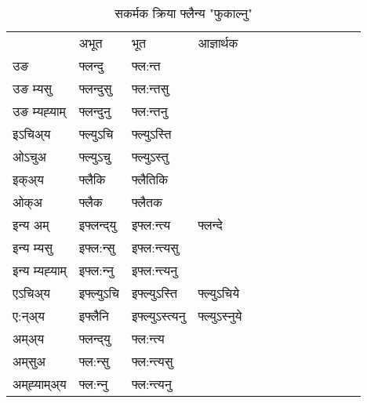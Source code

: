 \begin{table}[H]
\centering
\caption{\label{unt.vt} सकर्मक क्रिया  फ्लैन्य  "फुकाल्नु"  }
\begin{tabular}{l|l|l|l|l|l|l|l|l|l|l|l|l}  \toprule
&अभूत & भूत & आज्ञार्थक \\ 
उङ &फ्लन्दु &फ्ल:न्त \\ 
उङ म्यसु &फ्लन्दुसु &फ्ल:न्तसु \\ 
उङ म्यह्‍याम् &फ्लन्दुनु &फ्ल:न्तनु \\ 
इऽचिअ्य &फ्ल्युऽचि &फ्ल्युऽस्ति   \\ 
ओऽचुअ &फ्ल्युऽचु &फ्ल्युऽस्तु   \\ 
इक्अ्य &फ्लैकि &फ्लैतिकि   \\ 
ओक्अ &फ्लैक &फ्लैतक   \\ 
इन्य अम् & इफ्लन्द्‌यु  & इफ्ल:न्त्य &फ्लन्दे  \\ 
इन्य म्यसु & इफ्ल:न्सु  & इफ्ल:न्त्यसु   \\ 
इन्य म्यह्‍याम् & इफ्ल:न्‍नु  & इफ्ल:न्त्यनु   \\ 
एऽचिअ्य & इफ्ल्युऽचि & इफ्ल्युऽस्ति &फ्ल्युऽचिये    \\ 
ए:न्अ्य & इफ्लैनि  & इफ्ल्युऽस्त्यनु &फ्ल्युऽस्‍नुये  \\ 
अम्अ्य & फ्लन्द्‌यु  & फ्ल:न्त्य  \\ 
अम्‌सुअ & फ्ल:न्सु & फ्ल:न्त्यसु  \\ 
अम्‌ह्‍याम्अ्य & फ्ल:न्‍नु  & फ्ल:न्त्यनु \\ 
\bottomrule
\end{tabular}
\end{table}



